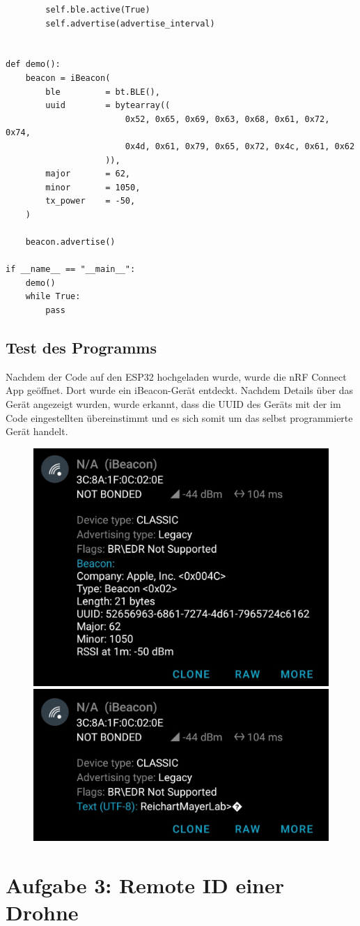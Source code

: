 \documentclass[twoside]{article}
\begin{document}
\begin{verbatim}
        self.ble.active(True)
        self.advertise(advertise_interval)


def demo():
    beacon = iBeacon(
        ble         = bt.BLE(), 
        uuid        = bytearray((
                        0x52, 0x65, 0x69, 0x63, 0x68, 0x61, 0x72, 0x74, 
                        0x4d, 0x61, 0x79, 0x65, 0x72, 0x4c, 0x61, 0x62
                    )),
        major       = 62,
        minor       = 1050,
        tx_power    = -50,
    )

    beacon.advertise()

if __name__ == "__main__":
    demo()
    while True:
        pass
\end{verbatim}

\subsection{Test des Programms}
Nachdem der Code auf den ESP32 hochgeladen wurde, wurde die nRF Connect App geöffnet. Dort wurde ein iBeacon-Gerät entdeckt. Nachdem Details über das Gerät angezeigt wurden, wurde erkannt, dass die UUID des Geräts mit der im Code eingestellten übereinstimmt und es sich somit um das selbst programmierte Gerät handelt.
\begin{figure}[h]
    \centering
    \includegraphics[width=0.5\linewidth]{img/nRF_01.jpg}
    \includegraphics[width=0.5\linewidth]{img/nRF_02.jpg}
\end{figure}
\newpage
\section{Aufgabe 3: Remote ID einer Drohne}
\end{document}
